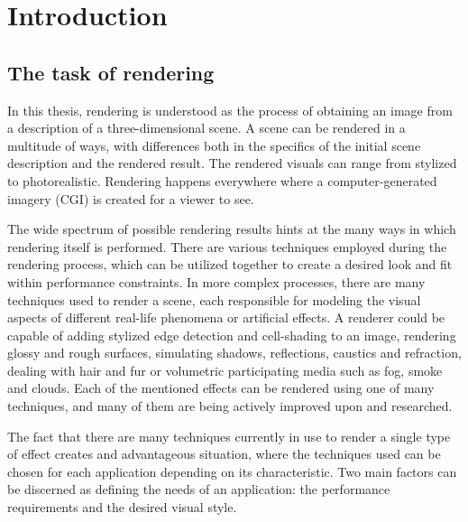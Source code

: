 \chapter{Introduction}

\section{The task of rendering}

In this thesis, rendering is understood as the process of obtaining an image from a description of a three-dimensional scene. A scene can be rendered in a multitude of ways, with differences both in the specifics of the initial scene description and the rendered result. The rendered visuals can range from stylized to photorealistic. Rendering happens everywhere where a computer-generated imagery (CGI) is created for a viewer to see.

The wide spectrum of possible rendering results hints at the many ways in which rendering itself is performed. There are various techniques employed during the rendering process, which can be utilized together to create a desired look and fit within performance constraints. In more complex processes, there are many techniques used to render a scene, each responsible for modeling the visual aspects of different real-life phenomena or artificial effects. A renderer could be capable of adding stylized edge detection and cell-shading to an image, rendering glossy and rough surfaces, simulating shadows, reflections, caustics and refraction, dealing with hair and fur or volumetric participating media such as fog, smoke and clouds. Each of the mentioned effects can be rendered using one of many techniques, and many of them are being actively improved upon and researched.

The fact that there are many techniques currently in use to render a single type of effect creates and advantageous situation, where the techniques used can be chosen for each application depending on its characteristic. Two main factors can be discerned as defining the needs of an application: the performance requirements and the desired visual style.

